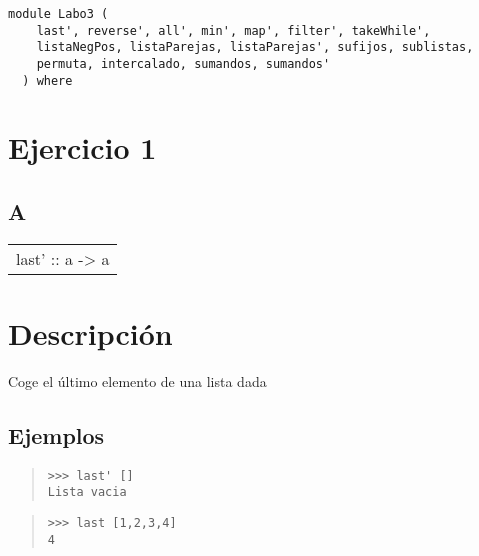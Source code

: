 \label{module:Labo3}
\haddockbeginheader
{\haddockverb\begin{verbatim}
module Labo3 (
    last', reverse', all', min', map', filter', takeWhile',
    listaNegPos, listaParejas, listaParejas', sufijos, sublistas,
    permuta, intercalado, sumandos, sumandos'
  ) where\end{verbatim}}
\haddockendheader

\section{Ejercicio 1}
\subsection{A}
\begin{haddockdesc}
\item[\begin{tabular}{@{}l}
last' :: {\char 91}a{\char 93} -> a
\end{tabular}]
{\haddockbegindoc
\section*{Descripción}
Coge el último elemento de una lista dada\par
\subsection*{Ejemplos}
\begin{quote}
{\haddockverb\begin{verbatim}
>>> last' []
Lista vacia

\end{verbatim}}
\end{quote}
\begin{quote}
{\haddockverb\begin{verbatim}
>>> last [1,2,3,4]
4

\end{verbatim}}
\end{quote}}
\end{haddockdesc}
